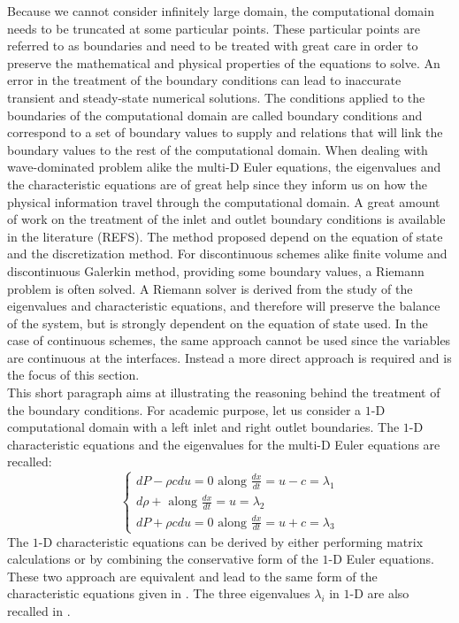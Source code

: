 Because we cannot consider infinitely large domain, the computational domain needs to be truncated at some particular points. These particular points are referred to as boundaries and need to be treated with great care in order to preserve the mathematical and physical properties of the equations to solve. An error in the treatment of the boundary conditions can lead to inaccurate transient and steady-state numerical solutions. The conditions applied to the boundaries of the computational domain are called boundary conditions and correspond to a set of boundary values to supply and relations that will link the boundary values to the rest of the computational domain. When dealing with wave-dominated problem alike the multi-D Euler equations, the eigenvalues and the characteristic equations are of great help since they inform us on how the physical information travel through the computational domain. A great amount of work on the treatment of the inlet and outlet boundary conditions is available in the literature (REFS). The method proposed depend on the equation of state and the discretization method. For discontinuous schemes alike finite volume and discontinuous Galerkin method, providing some boundary values, a Riemann problem is often solved. A Riemann solver is derived from the study of the eigenvalues and characteristic equations, and therefore will preserve the balance of the system, but is strongly dependent on the equation of state used. In the case of continuous schemes, the same approach cannot be used since the variables are continuous at the interfaces. Instead a more direct approach is required and is the focus of this section. \\
This short paragraph aims at illustrating the reasoning behind the treatment of the boundary conditions. For academic purpose, let us consider a $1$-D computational domain with a left inlet and right outlet boundaries. 
The $1$-D characteristic equations and the eigenvalues for the multi-D Euler equations are recalled:
\begin{equation}\label{eq:chara_equ}
\left\{
\begin{array}{lll}
dP - \rho c du = 0 \text{ along } \frac{dx}{dt} = u-c = \lambda_1\\
d\rho + \text{ along } \frac{dx}{dt} = u = \lambda_2\\
dP + \rho c du = 0 \text{ along } \frac{dx}{dt} = u +c = \lambda_3
\end{array}
\right.
\end{equation}
The $1$-D characteristic equations can be derived by either performing matrix calculations or by combining the conservative form of the $1$-D Euler equations. These two approach are equivalent and lead to the same form of the characteristic equations given in . The three eigenvalues $\lambda_i$ in $1$-D are also recalled in . 
